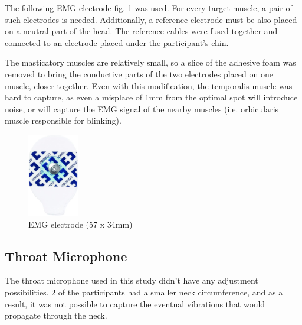 The following EMG electrode fig. \ref{image:emg_electrode} was used. For every target muscle, a pair of such electrodes is needed. Additionally, a reference electrode must be also placed on a neutral part of the head. The reference cables were fused together and connected to an electrode placed under the participant's chin.

The masticatory muscles are relatively small, so a slice of the adhesive foam was removed to bring the conductive parts of the two electrodes placed on one muscle, closer together. Even with this modification, the temporalis muscle was hard to capture, as even a misplace of 1mm from the optimal spot will introduce noise, or will capture the EMG signal of the nearby muscles (i.e. orbicularis muscle responsible for blinking).

\begin{figure}[h]
\centering
\includegraphics[width=0.2\textwidth]{src/media/study/electrode.jpg}
\caption{EMG electrode (57 x 34mm)}
\label{image:emg_electrode}
\end{figure}

\subsection{Throat Microphone}
\label{par:mic_attachment}

The throat microphone used in this study didn't have any adjustment possibilities. 2 of the participants had a smaller neck circumference, and as a result, it was not possible to capture the eventual vibrations that would propagate through the neck.

